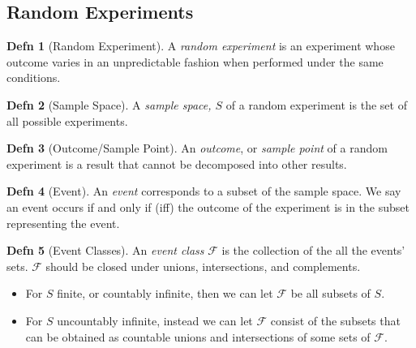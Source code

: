 \documentclass[10pt,letterpaper,final,twoside,notitlepage]{article}
\theoremstyle{plain}
\theoremstyle{definition}
\newtheorem{definition}{Defn}
\begin{document}
	\subsection{Random Experiments} \label{subsec:Random Experiments}
	\begin{definition}[Random Experiment] \label{def:Random Experiment}
		A \emph{random experiment} is an experiment whose outcome varies in an unpredictable fashion when performed under the same conditions.
	\end{definition}
	\begin{definition}[Sample Space] \label{def:Sample Space}
		A \emph{sample space, $S$} of a random experiment is the set of all possible experiments.
	\end{definition}
	\begin{definition}[Outcome/Sample Point] \label{def:Outcome}
		An \emph{outcome}, or \emph{sample point} of a random experiment is a result that cannot be decomposed into other results.
	\end{definition}
	\begin{definition}[Event] \label{def:Event}
		An \emph{event} corresponds to a subset of the sample space. We say an event occurs if and only if (iff) the outcome of the experiment is in the subset representing the event.
	\end{definition}
	\begin{definition}[Event Classes] \label{def:Event Classes}
		An \emph{event class} $\mathcal{F}$ is the collection of the all the events' sets. $\mathcal{F}$ should be closed under unions, intersections, and complements.
		\begin{itemize}[noitemsep, nolistsep]
			\item For $S$ finite, or countably infinite, then we can let $\mathcal{F}$ be all subsets of $S$.
			\item For $S$ uncountably infinite, instead we can let $\mathcal{F}$ consist of the subsets that can be obtained as countable unions and intersections of some sets of $\mathcal{F}$.
		\end{itemize}
	\end{definition}
\end{document}
